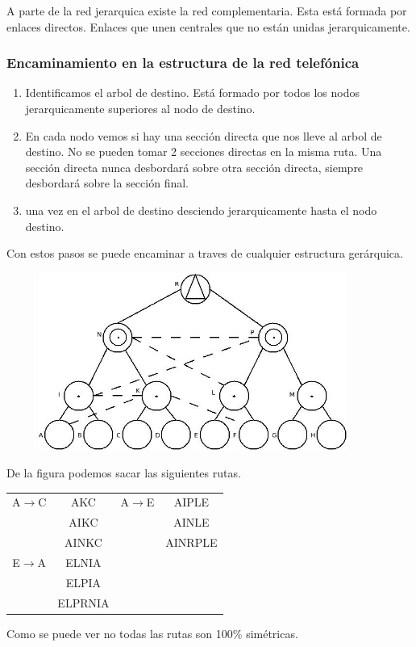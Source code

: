 A parte de la red jerarquica existe la red complementaria. Esta está formada por enlaces directos. Enlaces que unen centrales que no están unidas jerarquicamente.\\
\subsubsection{Encaminamiento en la estructura de la red telefónica}
\begin{enumerate}
\item Identificamos el arbol de destino. Está formado por todos los nodos jerarquicamente superiores al nodo de destino.
\item En cada nodo vemos si hay una sección directa que nos lleve al arbol de destino. No se pueden tomar 2 secciones directas en la misma ruta. Una sección directa nunca desbordará sobre otra sección directa, siempre desbordará sobre la sección final.
\item una vez en el arbol de destino desciendo jerarquicamente hasta el nodo destino.
\end{enumerate}
Con estos pasos se puede encaminar a traves de cualquier estructura gerárquica.
\begin{example}
\begin{figure}[H]
\centering
\includegraphics[width=0.9\textwidth]{Imagen/ejemploredtelefonica.jpg}
\label{}
\end{figure}
De la figura podemos sacar las siguientes rutas.\\
\begin{center}
\begin{tabular}{c c c c}
A$\to$C & AKC  		& A$\to$E 	& AIPLE 	\\
 		& AIKC 		&			& AINLE		\\
 		& AINKC		&			& AINRPLE	\\
E$\to$A & ELNIA  	& 		 	& 		 	\\
 		& ELPIA 	&			& 			\\
 		& ELPRNIA	&			& 			\\
\end{tabular}
\end{center}
Como se puede ver no todas las rutas son 100\% simétricas.
\end{example}
